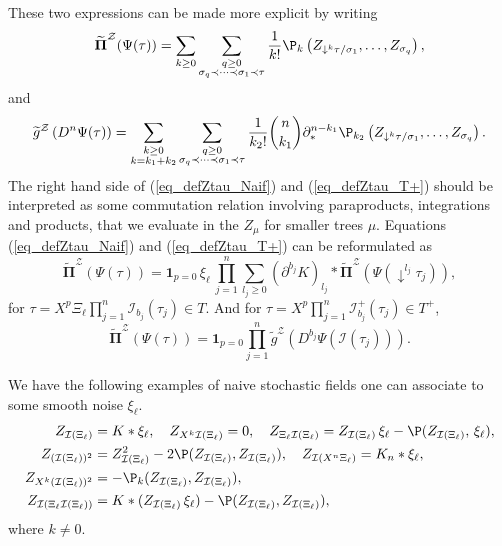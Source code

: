\documentclass[11pt]{preprint}
\newcommand{\mcI}{\mathcal{I}}
\newcommand{\mcZ}{\mathcal{Z}}
\def\PPi{\boldsymbol{\Pi}}
\def\eqref#1{(\ref{#1})}
\begin{document}
These two expressions can be made more explicit by writing
$$
\widetilde{ \PPi}^\mcZ(\Psi(\tau))= \sum_{k\geq 0} \sum_{\substack{ q\geq 0 \\ \sigma_q\prec\dots\prec\sigma_1\prec \tau  }} \frac{1}{k!} \P_k \left(Z_{\downarrow^k\tau/\sigma_1},\dots, Z_{\sigma_q}\right),
$$
and 
$$
\widetilde{ g}^\mcZ\left(D^{n}\Psi(\tau)\right) = \sum_{\substack{k\geq 0 \\ k=k_1+k_2}} \sum_{\substack{q\geq 0 \\ \sigma_q\prec\dots\prec\sigma_1\prec \tau }} \frac{1}{k_2!} \binom{n}{k_1}  \partial^{n-k_1}_*\P_{k_2}\left(  Z_{\downarrow^k\tau/\sigma_1},\dots, Z_{\sigma_q}   \right). 
$$
The right hand side of \eqref{eq_defZtau_Naif} and \eqref{eq_defZtau_T+} should be interpreted as some commutation relation involving paraproducts, integrations and products, that we evaluate in the $Z_\mu$ for smaller trees $\mu$. Equations \eqref{eq_defZtau_Naif} and \eqref{eq_defZtau_T+} can be reformulated as 
\begin{equation} \label{eq_defZtau_Naif_Alternative}
	\widetilde{ \PPi}^\mcZ\left(\Psi(\tau)\right) = \mathbf{1}_{p=0} \, \xi_\ell  \,  \prod_{j=1}^{n}\sum_{l_j\geq 0} (\partial^{b_j}K)_{l_j} * \widetilde{\PPi}^\mcZ\left(\Psi(\downarrow^{l_j}\tau_j)\right),  
\end{equation}
for $\tau = X^p\Xi_\ell\prod_{j=1}^n\mcI_{b_j}(\tau_j) \in T$. And for $\tau = X^p\prod_{j=1}^n\mcI^+_{b_j}(\tau_j) \in T^+$,
\begin{equation} \label{eq_defZtau_T+_alternative}
	\widetilde{ \PPi}^\mcZ\left(\Psi(\tau)\right) = \mathbf{1}_{p=0} \prod_{j=1}^{n} \widetilde{ g}^\mcZ\left(D^{b_j}\Psi(\mcI(\tau_j))\right).
\end{equation}

\begin{example} We have the following examples of naive stochastic fields one can associate to some smooth noise $\xi_\ell$.
	\begin{align*}
		Z_{\mcI(\Xi_\ell)} &= K * \xi_\ell ,
		\quad
		Z_{X^{k}\mcI(\Xi_\ell)} = 0, \quad 
		Z_{\Xi_\ell \mcI(\Xi_\ell)} =  Z_{\mcI(\Xi_\ell)} \, \xi_\ell - \P(Z_{\mcI(\Xi_\ell)},\, \xi_\ell),
		\\
		Z_{(\mcI(\Xi_\ell))^2} &= Z_{\mcI(\Xi_\ell)}^2 - 2 \P(Z_{\mcI(\Xi_\ell)}, Z_{\mcI(\Xi_\ell)} ),
		\quad 
		Z_{\mcI(X^n \Xi_\ell)} = K_n * \xi_\ell,
		\\
		Z_{X^k(\mcI(\Xi_\ell))^2} &= -\P_{k}( 	Z_{\mcI(\Xi_\ell)} , 	Z_{\mcI(\Xi_\ell)}  ), 
		\\
		Z_{\mcI(\Xi_\ell\mcI(\Xi_\ell)) } & = K * (  Z_{\mcI(\Xi_{\ell})} \, \xi_\ell)    -\P( 	Z_{\mcI(\Xi_\ell)} , 	Z_{\mcI(\Xi_\ell)}  ),  
	\end{align*}
	where $k \neq 0$.
\end{example}
\end{document}

